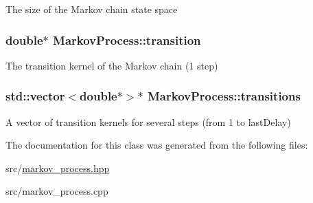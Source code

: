 The size of the Markov chain state space \hypertarget{classMarkovProcess_aae914f9e4fa973b5515bebc41508a289}{
\subsubsection[{transition}]{\setlength{\rightskip}{0pt plus 5cm}double$\ast$ Markov\-Process\-::transition}}\label{classMarkovProcess_aae914f9e4fa973b5515bebc41508a289}
The transition kernel of the Markov chain (1 step) \hypertarget{classMarkovProcess_a16e4250dba911530aff3d2766a367e5b}{
\subsubsection[{transitions}]{\setlength{\rightskip}{0pt plus 5cm}std\-::vector$<$double$\ast$$>$$\ast$ Markov\-Process\-::transitions}}\label{classMarkovProcess_a16e4250dba911530aff3d2766a367e5b}
A vector of transition kernels for several steps (from 1 to last\-Delay) 

The documentation for this class was generated from the following files\-:\begin{DoxyCompactItemize}
\item 
src/\hyperlink{markov__process_8hpp}{markov\-\_\-process.\-hpp}\item 
src/markov\-\_\-process.\-cpp\end{DoxyCompactItemize}
